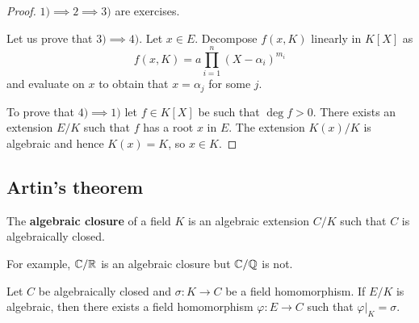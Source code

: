 \begin{proof}
	$1)\implies 2\implies 3)$ are exercises.  
	
	Let us prove that $3)\implies
	4)$. Let $x\in E$. Decompose $f(x,K)$ linearly in $K[X]$ as
	\[
        f(x,K)=a\prod_{i=1}^n(X-\alpha_i)^{m_i}
        \]
        and evaluate on $x$ to obtain that
	$x=\alpha_j$ for some $j$. 
	
	To prove that $4)\implies 1)$ let $f\in K[X]$ be
	such that $\deg f>0$. There exists an extension $E/K$ such that $f$ has a
	root $x$ in $E$. The extension $K(x)/K$ is algebraic and hence $K(x)=K$, so
	$x\in K$. 
\end{proof}



\subsection{Artin's theorem}

\begin{definition}
	The \textbf{algebraic closure} of a field $K$ is an algebraic extension $C/K$ 
	such that $C$ is algebraically closed. 
\end{definition}

For example, $\mathbb{C}/\mathbb{R}$ is an algebraic closure but $\mathbb{C}/\mathbb{Q}$ is not. 

\begin{proposition}
\label{pro:Artin}
	Let $C$ be algebraically closed and $\sigma\colon K\to C$ be a field homomorphism. If $E/K$ 
	is algebraic, then there exists a field homomorphism 
	$\varphi\colon E\to C$ such that 
	$\varphi|_K=\sigma$. 
\end{proposition}

